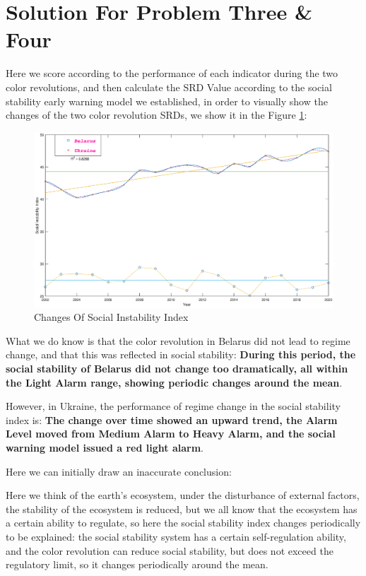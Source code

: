 \documentclass[12pt]{article}  %
\begin{document}
\section{Solution For Problem Three \& Four}
Here we score according to the performance of each indicator during the two color revolutions, and then calculate the SRD Value according to the social stability early warning model we established, in order to visually show the changes of the two color revolution SRDs, we show it in the Figure \ref{data}:
\begin{figure}[htbp]
\centering
\includegraphics[width=\textwidth]{img/data.eps}
\caption{Changes Of Social Instability Index}
\label{data}
\end{figure}

What we do know is that the color revolution in Belarus did not lead to regime change, and that this was reflected in social stability: \textbf{During this period, the social stability of Belarus did not change too dramatically, all within the Light Alarm range, showing periodic changes around the mean}.

However, in Ukraine, the performance of regime change in the social stability index is: \textbf{The change over time showed an upward trend, the Alarm Level moved from Medium Alarm to Heavy Alarm, and the social warning model issued a red light alarm}.

Here we can initially draw an inaccurate conclusion:

\begin{center}
\noindent{}
\end{center}

Here we think of the earth's ecosystem, under the disturbance of external factors, the stability of the ecosystem is reduced, but we all know that the ecosystem has a certain ability to regulate, so here the social stability index changes periodically to be explained: the social stability system has a certain self-regulation ability, and the color revolution can reduce social stability, but does not exceed the regulatory limit, so it changes periodically around the mean.
\end{document}
